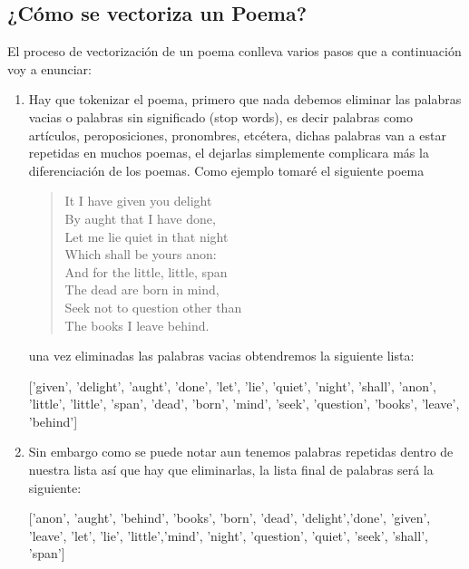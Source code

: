 \documentclass[a4paper, 11pt, oneside]{article}
\begin{document}
\subsection*{¿Cómo se vectoriza un Poema?}
El proceso de vectorización de un poema conlleva varios pasos que a continuación voy a enunciar:
\begin{enumerate}
    \item Hay que tokenizar el poema, primero que nada debemos eliminar las palabras vacias o palabras sin significado (stop words), es decir palabras como artículos, peroposiciones, pronombres, etcétera, dichas palabras van a estar repetidas en muchos poemas, el dejarlas simplemente complicara más la diferenciación de los poemas. Como ejemplo tomaré el siguiente poema
    \begin{verse}
        It I have given you delight\\ By aught that I have done,\\ Let me lie quiet in that night\\ Which shall be yours anon: \\And for the little, little, span\\The dead are born in mind,\\ Seek not to question other than\\ The books I leave behind.
    \end{verse}
    una vez eliminadas las palabras vacias obtendremos la siguiente lista:
    
    ['given', 'delight', 'aught', 'done', 'let', 'lie', 'quiet', 'night', 'shall', 'anon', 'little', 'little', 'span', 'dead', 'born', 'mind', 'seek', 'question', 'books', 'leave', 'behind']
\item Sin embargo como se puede notar aun tenemos palabras repetidas dentro de nuestra lista así que hay que eliminarlas, la lista final de palabras será la siguiente:

['anon', 'aught', 'behind', 'books', 'born', 'dead', 'delight','done', 'given', 'leave', 'let', 
'lie', 'little','mind', 'night', 'question', 'quiet', 'seek', 'shall', 'span']


\end{enumerate}
\end{document}

